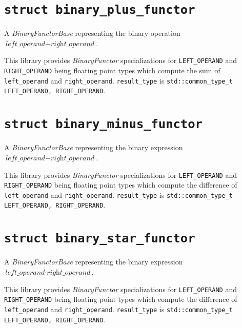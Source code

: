 \documentclass[oneside]{book}
\begin{document}


\section{\texttt{struct binary\_plus\_functor}}
A \textit{BinaryFunctorBase} representing the binary operation $\textit{left\_operand} + \textit{right\_operand}$.\newline

\noindent{}This library provides \textit{BinaryFunctor}       specializations for
\texttt{LEFT\_OPERAND} and \texttt{RIGHT\_OPERAND} being     floating point types
which compute  the sum    of  \texttt{left\_operand} and \texttt{right\_operand}.
\texttt{result\_type} is \texttt{std::common\_type\_t  \textlangle LEFT\_OPERAND,
RIGHT\_OPERAND\textrangle}.

\section{\texttt{struct binary\_minus\_functor}}
A \textit{BinaryFunctorBase} representing the binary expression $\textit{left\_operand} - \textit{right\_operand}$.\newline

\noindent{}This library provides \textit{BinaryFunctor}         specializations for
\texttt{LEFT\_OPERAND} and   \texttt{RIGHT\_OPERAND} being     floating point types
which compute the difference of \texttt{left\_operand} and \texttt{right\_operand}.
\texttt{result\_type} is \texttt{std::common\_type\_t  \textlangle   LEFT\_OPERAND,
RIGHT\_OPERAND\textrangle}.

\section{\texttt{struct binary\_star\_functor}}
A \textit{BinaryFunctorBase} representing the binary expression $\textit{left\_operand} \cdot \textit{right\_operand}$.\newline

\noindent{}This library provides \textit{BinaryFunctor}         specializations for
\texttt{LEFT\_OPERAND} and   \texttt{RIGHT\_OPERAND} being     floating point types
which compute the difference of \texttt{left\_operand} and \texttt{right\_operand}.
\texttt{result\_type} is \texttt{std::common\_type\_t  \textlangle   LEFT\_OPERAND,
RIGHT\_OPERAND\textrangle}.
\end{document}
